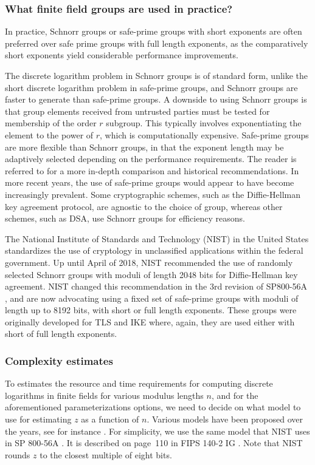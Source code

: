 \documentclass[superscriptaddress,notitlepage,longbibliography]{revtex4-1}
\theoremstyle{definition}
\theoremstyle{definition}
\begin{document}
\subsubsection{What finite field groups are used in practice?}
In practice, Schnorr groups or safe-prime groups with short exponents are often preferred over safe prime groups with full length exponents, as the comparatively short exponents yield considerable performance improvements.

The discrete logarithm problem in Schnorr groups is of standard form, unlike the short discrete logarithm problem in safe-prime groups, and Schnorr groups are faster to generate than safe-prime groups. A downside to using Schnorr groups is that group elements received from untrusted parties must be tested for membership of the order $r$ subgroup. This typically involves exponentiating the element to the power of $r$, which is computationally expensive. Safe-prime groups are more flexible than Schnorr groups, in that the exponent length may be adaptively selected depending on the performance requirements. The reader is referred to \cite{oorschot} for a more in-depth comparison and historical recommendations. In more recent years, the use of safe-prime groups would appear to have become increasingly prevalent. Some cryptographic schemes, such as the Diffie-Hellman key agreement protocol, are agnostic to the choice of group, whereas other schemes, such as DSA, use Schnorr groups for efficiency reasons.

The National Institute of Standards and Technology (NIST) in the United States standardizes the use of cryptology in unclassified applications within the federal government. Up until April of 2018, NIST recommended the use of randomly selected Schnorr groups with moduli of length 2048 bits for Diffie-Hellman key agreement. NIST changed this recommendation in the 3rd revision of SP800-56A \cite{nist-sp-800-56-part1-rev3-2018}, and are now advocating using a fixed set of safe-prime groups with moduli of length up to 8192 bits, with short or full length exponents. These groups were originally developed for TLS \cite{rfc-tls} and IKE \cite{rfc-ike} where, again, they are used either with short of full length exponents.

\subsubsection{Complexity estimates}
To estimates the resource and time requirements for computing discrete logarithms in finite fields for various modulus lengths $n$, and for the aforementioned  parameterizations options, we need to decide on what model to use for estimating $z$ as a function of $n$. Various models have been proposed over the years, see for instance \cite{lenstra-verheul-model-2001, lenstra-model-2004}. For simplicity, we use the same model that NIST uses in SP 800-56A \cite{nist-sp-800-56-part1-rev3-2018}. It is described on page~110 in FIPS 140-2 IG \cite{fips-140-2-IG}. Note that NIST rounds $z$ to the closest multiple of eight bits.
\end{document}
